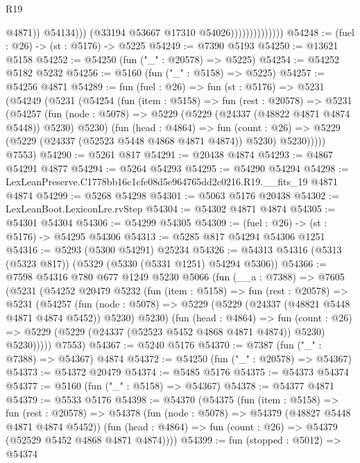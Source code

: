 \begin{lexlean}{R19}
\begin{coremodule}
                                        @4871))
                                    @54134)))
                              (@33194 @53667 @17310 @54026))))))))))))))
@54248 := (fuel : @26) -> (st : @5176) -> @5225
@54249 := @7390 @5193
@54250 := @13621 @5158
@54252 := @54250 (fun ("_" : @20578) => @5225)
@54254 := @54252 @5182 @5232
@54256 := @5160 (fun ("_" : @5158) => @5225)
@54257 := @54256 @4871
@54289 := fun (fuel : @26) =>
  fun (st : @5176) =>
  @5231
    (@54249
      (@5231
        (@54254
          (fun (item : @5158) =>
          fun (rest : @20578) =>
          @5231
            (@54257
              (fun (node : @5078) => @5229 (@5229 (@24337 (@48822 @4871 @4874 @5448)) @5230) @5230)
              (fun (head : @4864) =>
              fun (count : @26) =>
              @5229 (@5229 (@24337 (@52523 @5448 @4868 @4871 @4874)) @5230) @5230)))))
      @7553)
@54290 := @5261 @817
@54291 := @20438 @4874
@54293 := @4867 @54291 @4877
@54294 := @5264 @54293
@54295 := @54290 @54294
@54298 := LexLeanPreserve.C1778bb16c1cfe08d5e964765dd2c0216.R19.__fits_19 @4871 @4874
@54299 := @5268 @54298
@54301 := @5063 @5176 @20438
@54302 := LexLeanBoot.LexiconLre.rvStep
@54304 := @54302 @4871 @4874
@54305 := @54301 @54304
@54306 := @54299 @54305
@54309 := (fuel : @26) -> (st : @5176) -> @54295 @54306
@54313 := @5285 @817 @54294 @54306 @1251
@54316 := @5293 (@5300 @54291) @25234
@54326 := @54313 @54316 (@5313 (@5323 @817)) (@5329 (@5330 (@5331 @1251) @54294 @5306))
@54366 := @7598
    @54316
    @780
    @677
    @1249
    @5230
    @5066
    (fun (__a : @7388) =>
    @7605
      (@5231
        (@54252
          @20479
          @5232
          (fun (item : @5158) =>
          fun (rest : @20578) =>
          @5231
            (@54257
              (fun (node : @5078) =>
              @5229 (@5229 (@24337 (@48821 @5448 @4871 @4874 @5452)) @5230) @5230)
              (fun (head : @4864) =>
              fun (count : @26) =>
              @5229 (@5229 (@24337 (@52523 @5452 @4868 @4871 @4874)) @5230) @5230)))))
      @7553)
@54367 := @5240 @5176
@54370 := @7387 (fun ("_" : @7388) => @54367) @4874
@54372 := @54250 (fun ("_" : @20578) => @54367)
@54373 := @54372 @20479
@54374 := @5485 @5176
@54375 := @54373 @54374
@54377 := @5160 (fun ("_" : @5158) => @54367)
@54378 := @54377 @4871
@54379 := @5533 @5176
@54398 := @54370
    (@54375
      (fun (item : @5158) =>
      fun (rest : @20578) =>
      @54378
        (fun (node : @5078) => @54379 (@48827 @5448 @4871 @4874 @5452))
        (fun (head : @4864) => fun (count : @26) => @54379 (@52529 @5452 @4868 @4871 @4874))))
@54399 := fun (stopped : @5012) => @54374

\end{coremodule}
\end{lexlean}

